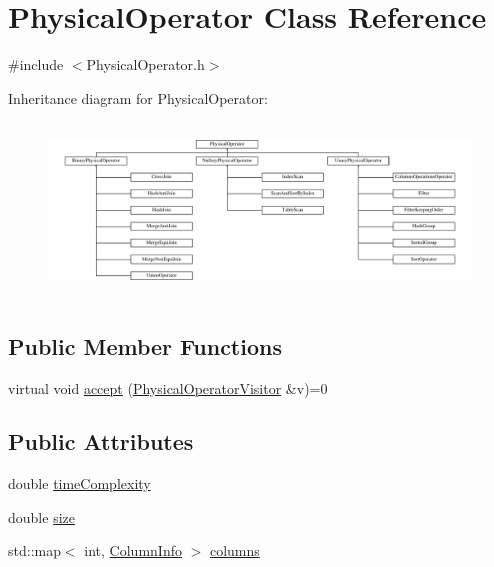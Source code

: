 \hypertarget{class_physical_operator}{\section{Physical\+Operator Class Reference}
\label{class_physical_operator}
}


{\ttfamily \#include $<$Physical\+Operator.\+h$>$}

Inheritance diagram for Physical\+Operator\+:\begin{figure}[H]
\begin{center}
\leavevmode
\includegraphics[height=4.640884cm]{class_physical_operator}
\end{center}
\end{figure}
\subsection*{Public Member Functions}
\begin{DoxyCompactItemize}
\item 
virtual void \hyperlink{class_physical_operator_aec6926a904c71c0619d6e9e1457252cd}{accept} (\hyperlink{class_physical_operator_visitor}{Physical\+Operator\+Visitor} \&v)=0
\end{DoxyCompactItemize}
\subsection*{Public Attributes}
\begin{DoxyCompactItemize}
\item 
double \hyperlink{class_physical_operator_a88836a2b6453889b6ad852a2121ca512}{time\+Complexity}
\item 
double \hyperlink{class_physical_operator_a744971579c457601553e8e9a70a5cee1}{size}
\item 
std\+::map$<$ int, \hyperlink{class_column_info}{Column\+Info} $>$ \hyperlink{class_physical_operator_aaf7e49cbadd48e7b0b30e9a84367e5de}{columns}
\end{DoxyCompactItemize}


